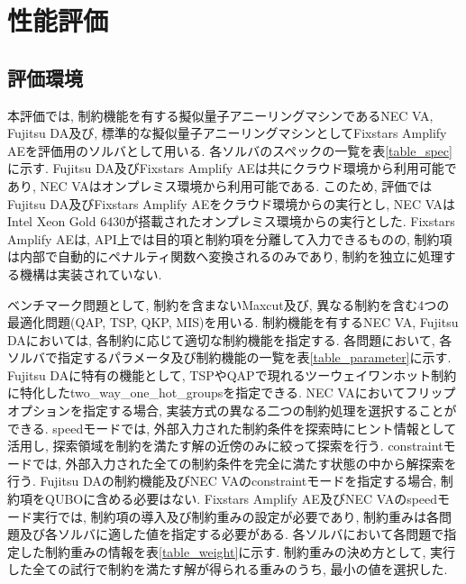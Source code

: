 \documentclass[submit,techrep,noauthor]{ipsj}
\begin{document}
\section{性能評価}

\subsection{評価環境}
本評価では, 制約機能を有する擬似量子アニーリングマシンであるNEC VA, Fujitsu DA及び, 標準的な擬似量子アニーリングマシンとしてFixstars Amplify AEを評価用のソルバとして用いる. 各ソルバのスペックの一覧を表\ref{table_spec}に示す. Fujitsu DA及びFixstars Amplify AEは共にクラウド環境から利用可能であり, NEC VAはオンプレミス環境から利用可能である. このため, 評価ではFujitsu DA及びFixstars Amplify AEをクラウド環境からの実行とし, NEC VAはIntel Xeon Gold 6430が搭載されたオンプレミス環境からの実行とした. Fixstars Amplify AEは, API上では目的項と制約項を分離して入力できるものの, 制約項は内部で自動的にペナルティ関数へ変換されるのみであり, 制約を独立に処理する機構は実装されていない. 

ベンチマーク問題として, 制約を含まないMaxcut及び, 異なる制約を含む4つの最適化問題(QAP, TSP, QKP, MIS)を用いる. 制約機能を有するNEC VA, Fujitsu DAにおいては, 各制約に応じて適切な制約機能を指定する. 各問題において, 各ソルバで指定するパラメータ及び制約機能の一覧を表\ref{table_parameter}に示す. Fujitsu DAに特有の機能として, TSPやQAPで現れるツーウェイワンホット制約に特化したtwo\_way\_one\_hot\_groupsを指定できる. NEC VAにおいてフリップオプションを指定する場合, 実装方式の異なる二つの制約処理を選択することができる. speedモードでは, 外部入力された制約条件を探索時にヒント情報として活用し, 探索領域を制約を満たす解の近傍のみに絞って探索を行う. constraintモードでは, 外部入力された全ての制約条件を完全に満たす状態の中から解探索を行う. Fujitsu DAの制約機能及びNEC VAのconstraintモードを指定する場合, 制約項をQUBOに含める必要はない. Fixstars Amplify AE及びNEC VAのspeedモード実行では, 制約項の導入及び制約重みの設定が必要であり, 制約重みは各問題及び各ソルバに適した値を指定する必要がある. 各ソルバにおいて各問題で指定した制約重みの情報を表\ref{table_weight}に示す. 制約重みの決め方として, 実行した全ての試行で制約を満たす解が得られる重みのうち, 最小の値を選択した.
\end{document}
